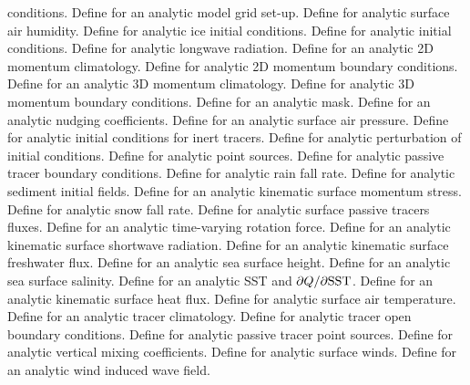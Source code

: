 \begin{klist}
\begin{klist}
  conditions.
        Define for an analytic model grid set-up.
     Define for analytic surface air humidity.
         Define for analytic ice initial conditions.
     Define for analytic initial conditions.
      Define for analytic longwave radiation.
     Define for an analytic 2D momentum climatology.
       Define for analytic 2D momentum boundary
  conditions.
     Define for an analytic 3D momentum climatology.
       Define for analytic 3D momentum boundary
  conditions.
        Define for an analytic mask.
     Define for an analytic nudging
  coefficients.
        Define for an analytic surface air pressure.
     Define for analytic initial conditions for
  inert tracers.
     Define for analytic perturbation of initial
  conditions.
     Define for analytic point sources.
       Define for analytic passive tracer boundary
  conditions.
        Define for analytic rain fall rate.
     Define for analytic sediment initial fields.
      Define for an analytic kinematic surface
  momentum stress.
        Define for analytic snow fall rate.
      Define for analytic surface passive tracers
  fluxes.
      Define for an analytic time-varying rotation
  force.
      Define for an analytic kinematic surface
  shortwave radiation.
      Define for an analytic kinematic surface
  freshwater flux.
      Define for an analytic sea surface height.
      Define for an analytic sea surface salinity.
      Define for an analytic SST and
  $\partial Q /\partial {\rm SST}$.
      Define for an analytic kinematic surface
  heat flux.
        Define for analytic surface air temperature.
      Define for an analytic tracer climatology.
       Define for analytic tracer open boundary
  conditions.
     Define for analytic passive tracer
  point sources.
        Define for analytic vertical mixing
  coefficients.
       Define for analytic surface winds.
       Define for an analytic wind induced wave
  field.
  \end{klist}

\end{klist}

